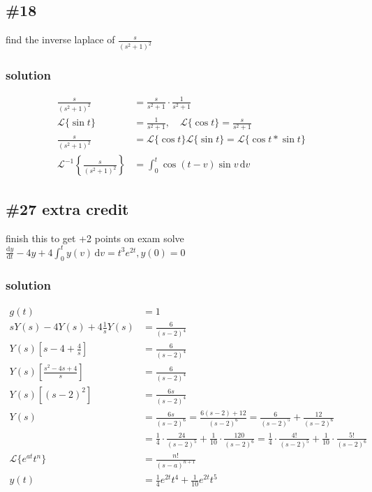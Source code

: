 \documentclass{article}
\begin{document}
\subsection*{\#18}
find the inverse laplace of $\frac{s}{(s^2+1)^2}$
\subsubsection*{solution}
\begin{align*}
	\frac{s}{(s^2+1)^2}&=\frac{s}{s^2+1}\cdot\frac{1}{s^2+1}\\
	\mathcal{L}\{\sin t\}&=\frac{1}{s^2+1},\quad \mathcal{L}\{\cos t\}=\frac{s}{s^2+1}\\
	\frac{s}{(s^2+1)^2}&=\mathcal{L}\{\cos t\}\mathcal{L}\{\sin t\}=\mathcal{L}\{\cos t*\sin t\}\\
	\mathcal{L}^{-1}\left\{\frac{s}{(s^2+1)^2}\right\}&=\int_0^t{\cos(t-v)\sin v\,\mathrm{d}v}
\end{align*}

\subsection*{\#27 extra credit}
finish this to get +2 points on exam
solve $\frac{\mathrm{d}y}{\mathrm{d}t}-4y+4\int_0^t{y(v)\,\mathrm{d}v}=t^3e^{2t},y(0)=0$
\subsubsection*{solution}
\begin{align*}
    g(t)&=1\\
    sY(s)-4Y(s)+4\frac{1}{s}Y(s)&=\frac{6}{(s-2)^4}\\
    Y(s)\left[s-4+\frac{4}{s}\right]&=\frac{6}{(s-2)^4}\\
    Y(s)\left[\frac{s^2-4s+4}{s}\right]&=\frac{6}{(s-2)^4}\\
	Y(s)\left[(s-2)^2\right]&=\frac{6s}{(s-2)^4}\\
	Y(s)&=\frac{6s}{(s-2)^6}=\frac{6(s-2)+12}{(s-2)^6}=\frac{6}{(s-2)^5}+\frac{12}{(s-2)^6}\\
	    &=\frac{1}{4}\cdot\frac{24}{(s-2)^5}+\frac{1}{10}\cdot\frac{120}{(s-2)^6}=\frac{1}{4}\cdot\frac{4!}{(s-2)^5}+\frac{1}{10}\cdot\frac{5!}{(s-2)^6}\\
	\mathcal{L}\{e^{at}t^n\}&=\frac{n!}{(s-a)^{n+1}}\\
	y(t)&=\frac{1}{4}e^{2t}t^4+\frac{1}{10}e^{2t}t^5
\end{align*}
\end{document}
